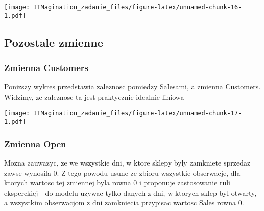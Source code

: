 \documentclass[]{article}
\newenvironment{Shaded}{\begin{snugshade}}{\end{snugshade}}
\newcommand{\DataTypeTok}[1]{\textcolor[rgb]{0.13,0.29,0.53}{#1}}
\newcommand{\FloatTok}[1]{\textcolor[rgb]{0.00,0.00,0.81}{#1}}
\newcommand{\KeywordTok}[1]{\textcolor[rgb]{0.13,0.29,0.53}{\textbf{#1}}}
\newcommand{\NormalTok}[1]{#1}
\newcommand{\OperatorTok}[1]{\textcolor[rgb]{0.81,0.36,0.00}{\textbf{#1}}}
\newcommand{\StringTok}[1]{\textcolor[rgb]{0.31,0.60,0.02}{#1}}
\begin{document}
\texttt{[image: ITMagination\_zadanie\_files/figure-latex/unnamed-chunk-16-1.pdf]}

\hypertarget{pozostale-zmienne}{%
\subsection{Pozostale zmienne}\label{pozostale-zmienne}}

\hypertarget{zmienna-customers}{%
\subsubsection{Zmienna Customers}\label{zmienna-customers}}

Ponizszy wykres przedstawia zaleznosc pomiedzy Salesami, a zmienna
Customers. Widzimy, ze zaleznosc ta jest praktycznie idealnie liniowa

\begin{Shaded}
\end{Shaded}

\texttt{[image: ITMagination\_zadanie\_files/figure-latex/unnamed-chunk-17-1.pdf]}

\hypertarget{zmienna-open}{%
\subsubsection{Zmienna Open}\label{zmienna-open}}

Mozna zauwazyc, ze we wszystkie dni, w ktore sklepy byly zamkniete
sprzedaz zawse wynosila 0. Z tego powodu usune ze zbioru wszystkie
obserwacje, dla ktorych wartosc tej zmiennej byla rowna 0 i proponuje
zastosowanie ruli eksperckiej - do modelu uzywac tylko danych z dni, w
ktorych sklep byl otwarty, a wszystkim obserwacjom z dni zamkniecia
przypisac wartosc Sales rowna 0.
\end{document}
